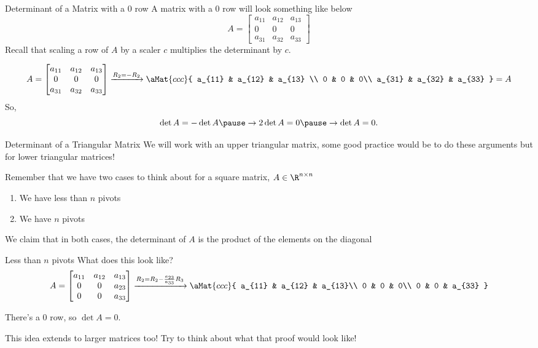 \documentclass[xcoler=dvipsnames, aspectratio=169]{beamer}
\begin{document}
    \begin{frame}{Determinant of a Matrix with a 0 row}
        A matrix with a $0$ row will look something like below
        \[
            A = \begin{bmatrix}
                a_{11} & a_{12} & a_{13} \\
                0 & 0 & 0\\
                a_{31} & a_{32} & a_{33}
            \end{bmatrix}
        \]\pause
        Recall that scaling a row of $A$ by a scaler $c$ multiplies the determinant by $c$.
        \pause

        \[
            A = \begin{bmatrix}
                a_{11} & a_{12} & a_{13} \\
                0 & 0 & 0\\
                a_{31} & a_{32} & a_{33}
            \end{bmatrix}\xrightarrow{R_2 = -R_2}\aMat{ccc}{
                a_{11} & a_{12} & a_{13} \\
                0 & 0 & 0\\
                a_{31} & a_{32} & a_{33}
            } = A
        \]
        \pause
        So,
        \[
            \det{A} = -\det{A}\pause\rightarrow 2\det{A} = 0\pause\rightarrow \det{A} = 0.
        \]
    \end{frame}
    \begin{frame}{Determinant of a Triangular Matrix}
        We will work with an upper triangular matrix, some good practice would be to
        do these arguments but for lower triangular matrices!\pause

        Remember that we have two cases to think about for a square matrix, $A\in\R^{n\times n}$
        \begin{enumerate}
            \pause\item We have less than $n$ pivots
            \pause\item We have $n$ pivots
        \end{enumerate}\pause
        We claim that in both cases, the determinant of $A$ is the product of the elements
        on the diagonal
    \end{frame}
    \begin{frame}{Less than $n$ pivots}
        What does this look like?\pause
        \[
            A = \begin{bmatrix}
                a_{11} & a_{12} & a_{13}\\
                0 & 0 & a_{23}\\
                0 & 0 & a_{33}
            \end{bmatrix}\xrightarrow{R_2=R_2 - \frac{a_{23}}{a_{33}}R_3}\aMat{ccc}{
                a_{11} & a_{12} & a_{13}\\
                0 & 0 & 0\\
                0 & 0 & a_{33}
            }
        \]
        \pause

        There's a 0 row, so $\det{A} = 0$.\pause

        This idea extends to larger matrices too! Try to think about what that proof
        would look like!
    \end{frame}
\end{document}
